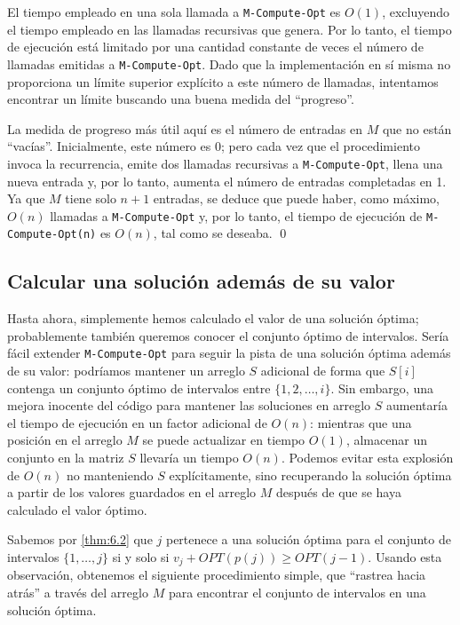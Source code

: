 \documentclass[a4paper, 12pt]{book}
\theoremstyle{dotless}
\renewenvironment{proof}{\vspace{12pt}{\noindent\bfseries Demostración.}}{\qed\vspace{12pt}}
\begin{document}
\begin{proof}
El tiempo empleado en una sola llamada a \texttt{M-Compute-Opt} es $O(1)$, excluyendo el tiempo empleado en las llamadas recursivas que genera. Por lo tanto, el tiempo de ejecución está limitado por una cantidad constante de veces el número de llamadas emitidas a \texttt{M-Compute-Opt}. Dado que la implementación en sí misma no proporciona un límite superior explícito a este número de llamadas, intentamos encontrar un límite buscando una buena medida del ``progreso''.

La medida de progreso más útil aquí es el número de entradas en $M$ que no están ``vacías''. Inicialmente, este número es 0; pero cada vez que el procedimiento invoca la recurrencia, emite dos llamadas recursivas a \texttt{M-Compute-Opt}, llena una nueva entrada y, por lo tanto, aumenta el número de entradas completadas en 1. Ya que $M$ tiene solo $n + 1$ entradas, se deduce que puede haber, como máximo, $O(n)$ llamadas a \texttt{M-Compute-Opt} y, por lo tanto, el tiempo de ejecución de \texttt{M-Compute-Opt(n)} es $O(n)$, tal como se deseaba.
\end{proof} 

\subsection*{Calcular una solución además de su valor}

Hasta ahora, simplemente hemos calculado el valor de una solución óptima; probablemente también queremos conocer el conjunto óptimo de intervalos. Sería fácil extender \texttt{M-Compute-Opt} para seguir la pista de una solución óptima además de su valor: podríamos mantener un arreglo $S$ adicional de forma que $S[i]$ contenga un conjunto óptimo de intervalos entre $\{1,2,\dots,i\}$. Sin embargo, una mejora inocente del código para mantener las soluciones en arreglo $S$ aumentaría el tiempo de ejecución en un factor adicional de $O(n)$: mientras que una posición en el arreglo $M$ se puede actualizar en tiempo $O(1)$, almacenar un conjunto en la matriz $S$ llevaría un tiempo $O(n)$. Podemos evitar esta explosión de $O(n)$ no manteniendo $S$ explícitamente, sino recuperando la solución óptima a partir de los valores guardados en el arreglo $M$ después de que se haya calculado el valor óptimo.

Sabemos por \ref{thm:6.2} que $j$ pertenece a una solución óptima para el conjunto de intervalos $\{1,\dots,j\}$ si y solo si $v_j + OPT(p(j)) \geq OPT(j-1)$. Usando esta observación, obtenemos el siguiente procedimiento simple, que ``rastrea hacia atrás'' a través del arreglo $M$ para encontrar el conjunto de intervalos en una solución óptima.
\end{document}
